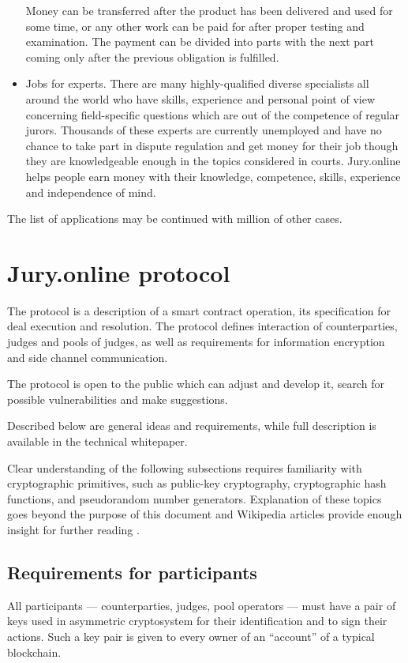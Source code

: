 \documentclass[12pt]{article}
\begin{document}
\begin{itemize}
				Money can be transferred after the product has been delivered and used for some time, or any other work can be paid for after proper testing
				and examination. The payment can be divided into parts with the next part coming only after the previous obligation is fulfilled.

		\item Jobs for experts.  There are many highly-qualified diverse specialists all around the world who have skills, experience and personal
				point of view concerning field-specific questions which are out of the competence of regular jurors. Thousands of these experts are
				currently unemployed and have no chance to take part in dispute regulation and get money for their job though they are knowledgeable enough
				in the topics considered in courts. Jury.online helps people earn money with their knowledge, competence, skills, experience and
				independence of mind. 
\end{itemize}
The list of applications may be continued with million of other cases.
\section{Jury.online protocol}
The protocol is a description of a smart contract operation, its specification for deal execution and resolution. The protocol defines
interaction of counterparties, judges and pools of judges, as well as requirements for information encryption and side channel
communication. 

The protocol is open to the public which can adjust and develop it, search for possible vulnerabilities and make suggestions. 

Described below are general ideas and requirements, while full description is available in the technical whitepaper.

Clear understanding of the following subsections requires familiarity with cryptographic primitives, such as public-key
cryptography, cryptographic hash functions, and pseudorandom number generators. Explanation of these topics goes beyond
the purpose of this document and Wikipedia articles provide enough insight for further reading  \cite{publickey, hash, prng}.


\subsection{Requirements for participants}
All participants — counterparties, judges, pool operators --- must have a pair of keys used in asymmetric cryptosystem for their
identification and to sign their actions. Such a key pair is given to every owner of an ``account'' of a typical blockchain.
\end{document}
